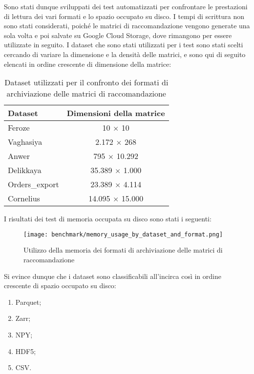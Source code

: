Sono stati dunque sviluppati dei test automatizzati per confrontare le prestazioni di lettura dei vari formati e lo spazio occupato su disco. I tempi di scrittura non sono stati considerati, poiché le matrici di raccomandazione vengono generate una sola volta e poi salvate su Google Cloud Storage, dove rimangono per essere utilizzate in seguito. I dataset che sono stati utilizzati per i test sono stati scelti cercando di variare la dimensione e la densità delle matrici, e sono qui di seguito elencati in ordine crescente di dimensione della matrice:
\begin{table}[h]
    \centering
    \begin{tabular}{|l|c|}
        \hline
        \textbf{Dataset} & \textbf{Dimensioni della matrice} \\
        \hline
        Feroze & 10 $\times$ 10 \\
        Vaghasiya & 2.172 $\times$ 268 \\
        Anwer & 795 $\times$ 10.292 \\
        Delikkaya & 35.389 $\times$ 1.000 \\
        Orders\_export & 23.389 $\times$ 4.114 \\
        Cornelius & 14.095 $\times$ 15.000 \\
        \hline
    \end{tabular}
    \caption{Dataset utilizzati per il confronto dei formati di archiviazione delle matrici di raccomandazione}
    \label{tab:dataset-matrici}
\end{table}

I risultati dei test di memoria occupata su disco sono stati i seguenti:

\begin{figure}[!h]
    \centering
    \texttt{[image: benchmark/memory\_usage\_by\_dataset\_and\_format.png]}
    \caption{Utilizzo della memoria dei formati di archiviazione delle matrici di raccomandazione}
    \label{fig:memory-usage-recommendation-matrices}
\end{figure}

Si evince dunque che i dataset sono classificabili all'incirca così in ordine crescente di spazio occupato su disco:
\begin{enumerate}
    \item Parquet;
    \item Zarr;
    \item NPY;
    \item HDF5;
    \item CSV.
\end{enumerate}

